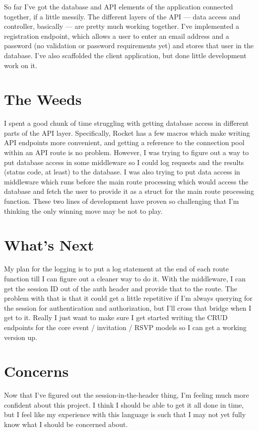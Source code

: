 \documentclass{article}
\begin{document}
  So far I've got the database and API elements of the application connected together, if a little messily. The different layers of the API --- data access and controller, basically --- are pretty much working together. I've implemented a registration endpoint, which allows a user to enter an email address and a password (no validation or password requirements yet) and stores that user in the database. I've also scaffolded the client application, but done little development work on it.

  \section{The Weeds}

  I spent a good chunk of time struggling with getting database access in different parts of the API layer. Specifically, Rocket has a few macros which make writing API endpoints more convenient, and getting a reference to the connection pool within an API route is no problem. However, I was trying to figure out a way to put database access in some middleware so I could log requests and the results (status code, at least) to the database. I was also trying to put data access in middleware which runs before the main route processing which would access the database and fetch the user to provide it as a struct for the main route processing function. These two lines of development have proven so challenging that I'm thinking the only winning move may be not to play.

  \section{What's Next}

  My plan for the logging is to put a log statement at the end of each route function till I can figure out a cleaner way to do it. With the middleware, I can get the session ID out of the auth header and provide that to the route. The problem with that is that it could get a little repetitive if I'm always querying for the session for authentication and authorization, but I'll cross that bridge when I get to it. Really I just want to make sure I get started writing the CRUD endpoints for the core event / invitation / RSVP models so I can get a working version up.

  \section{Concerns}

  Now that I've figured out the session-in-the-header thing, I'm feeling much more confident about this project. I think I should be able to get it all done in time, but I feel like my experience with this language is such that I may not yet fully know what I should be concerned about.
\end{document}
